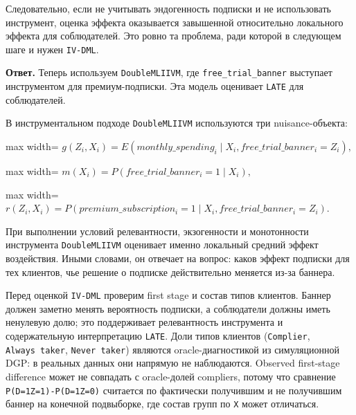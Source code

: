 \documentclass[11pt]{article}
\begin{document}
Следовательно, если не учитывать эндогенность подписки и не использовать
инструмент, оценка эффекта оказывается завышенной относительно
локального эффекта для соблюдателей. Это ровно та проблема, ради которой
в следующем шаге и нужен \texttt{IV-DML}.

    \textbf{Ответ.} Теперь используем \texttt{DoubleMLIIVM}, где
\texttt{free\_trial\_banner} выступает инструментом для
премиум-подписки. Эта модель оценивает \texttt{LATE} для соблюдателей.

В инструментальном подходе \texttt{DoubleMLIIVM} используются три
nuisance-объекта:

\begin{center}
\begin{adjustbox}{max width=\linewidth}
\(\displaystyle g(Z_i, X_i) = E(monthly\_spending_i \mid X_i, free\_trial\_banner_i = Z_i),\)
\end{adjustbox}
\end{center}
\begin{center}
\begin{adjustbox}{max width=\linewidth}
\(\displaystyle m(X_i) = P(free\_trial\_banner_i = 1 \mid X_i),\)
\end{adjustbox}
\end{center}
\begin{center}
\begin{adjustbox}{max width=\linewidth}
\(\displaystyle r(Z_i, X_i) = P(premium\_subscription_i = 1 \mid X_i, free\_trial\_banner_i = Z_i).\)
\end{adjustbox}
\end{center}

При выполнении условий релевантности, экзогенности и монотонности
инструмента \texttt{DoubleMLIIVM} оценивает именно локальный средний
эффект воздействия. Иными словами, он отвечает на вопрос: каков эффект
подписки для тех клиентов, чье решение о подписке действительно меняется
из-за баннера.

    Перед оценкой \texttt{IV-DML} проверим first stage и состав типов
клиентов. Баннер должен заметно менять вероятность подписки, а
соблюдатели должны иметь ненулевую долю; это поддерживает релевантность
инструмента и содержательную интерпретацию \texttt{LATE}. Доли типов
клиентов (\texttt{Complier}, \texttt{Always\ taker},
\texttt{Never\ taker}) являются oracle-диагностикой из симуляционной
DGP: в реальных данных они напрямую не наблюдаются. Observed first-stage
difference может не совпадать с oracle-долей compliers, потому что
сравнение \texttt{P(D=1\textbar{}Z=1)-P(D=1\textbar{}Z=0)} считается по
фактически получившим и не получившим баннер на конечной подвыборке, где
состав групп по \texttt{X} может отличаться.
\end{document}
